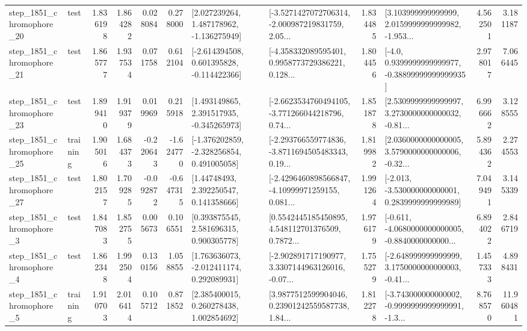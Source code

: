 \begin{tabular}{llrrrrllrlrr}
 step\_1851\_chromophore\_20 &      test &      1.836198 &    1.864282 &      0.028084 &  0.278000 &    [2.027239264, 1.487178962, -1.136275949] &  [-3.5271427072706314, -2.000987219831759, 2.05... &       1.834485 &  [3.103999999999999, 2.0159999999999982, -1.953... &            4.562501 &          3.181187 \\
 step\_1851\_chromophore\_21 &      test &      1.865777 &    1.937534 &      0.071758 &  0.612104 &   [-2.614394508, 0.601395828, -0.114422366] &  [-4.358332089595401, 0.9958773729386221, 0.128... &       1.804456 &   [-4.0, 0.9399999999999977, -0.38899999999999935] &            2.978017 &          7.066445 \\
 step\_1851\_chromophore\_23 &      test &      1.899410 &    1.919379 &      0.019969 &  0.215918 &    [1.493149865, 2.391517935, -0.345265973] &  [-2.6623534760494105, -3.771266044218796, 0.74... &       1.851878 &  [2.5309999999999997, 3.2730000000000032, -0.81... &            6.996662 &          3.128555 \\
 step\_1851\_chromophore\_25 &  training &      1.905016 &    1.684373 &     -0.220643 & -1.624770 &   [-1.376202859, -2.328256854, 0.491005058] &  [-2.293766559774836, -3.8711694505483343, 0.19... &       1.819982 &  [2.0360000000000005, 3.5790000000000006, -0.32... &            5.894362 &          2.274553 \\
 step\_1851\_chromophore\_27 &      test &      1.802157 &    1.709285 &     -0.092872 & -0.647315 &      [1.44748493, 2.392250547, 0.141358666] &  [-2.4296460898566847, -4.10999971259155, 0.081... &       1.991264 &   [-2.013, -3.530000000000001, 0.2839999999999989] &            7.049491 &          3.145339 \\
  step\_1851\_chromophore\_3 &      test &      1.847083 &    1.852755 &      0.005673 &  0.106551 &     [0.393875545, 2.581696315, 0.900305778] &  [0.5542445185450895, 4.548112701376509, 0.7872... &       1.976179 &  [-0.611, -4.0680000000000005, -0.8840000000000... &            6.894022 &          2.846719 \\
  step\_1851\_chromophore\_4 &      test &      1.862348 &    1.992504 &      0.130156 &  1.058855 &    [1.763636073, -2.012411174, 0.292089931] &  [-2.902891717190977, 3.3307144963126016, -0.07... &       1.755279 &  [-2.648999999999999, 3.1750000000000003, -0.41... &            1.457333 &          4.898431 \\
  step\_1851\_chromophore\_5 &  training &      1.910703 &    2.016414 &      0.105712 &  0.871852 &     [2.385400015, 0.260278438, 1.002854692] &  [3.9877512599904046, 0.23901242559587738, 1.84... &       1.812278 &  [-3.743000000000002, -0.9999999999999991, -1.3... &            8.768570 &         11.960481 \\

\end{tabular}
